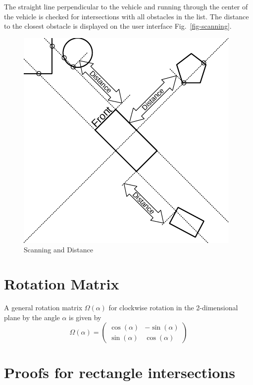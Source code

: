 \documentclass[11pt]{article}
\newcommand{\figref}[1]{Fig.~\eqref{#1}}
\begin{document}
The straight line perpendicular to the vehicle and running through the center
of the vehicle is checked for intersections with all obstacles in the list.
The distance to the closest obstacle is displayed on the user interface
\figref{fig-scanning}.

\begin{figure}
    \centering
    \includegraphics{scanning.pdf}
    \caption{Scanning and Distance}\label{fig-scanning}
\end{figure}

\appendix
\section{Rotation Matrix}
\label{appendix-rotation-matrix}
A general rotation matrix $\Omega(\alpha)$ for clockwise rotation in the
2-dimensional plane by the angle $\alpha$ is given by
\begin{equation}
    \Omega(\alpha) = \begin{pmatrix}
        \cos(\alpha) & -\sin(\alpha) \\
        \sin(\alpha) & \cos(\alpha)
    \end{pmatrix}
\end{equation}

\section{Proofs for rectangle intersections}
\label{appendix-proofs-rectangle-intersections}
\end{document}
